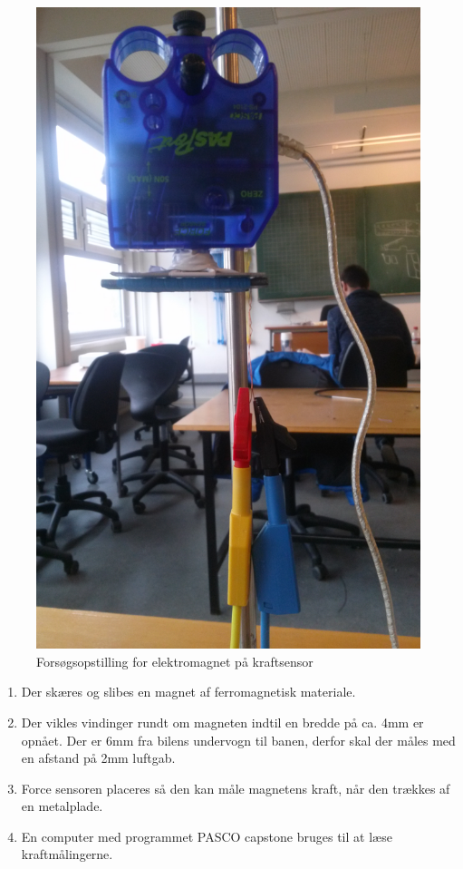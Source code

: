 \begin{figure}[h!]
\includegraphics[scale=0.04, angle=270]{./Graphics/Forsogs_opstilling}
\caption{Forsøgsopstilling for elektromagnet på kraftsensor}
\label{Opstilling}
\end{figure}

\begin{enumerate}
	\item Der skæres og slibes en magnet af ferromagnetisk materiale. 
	\item Der vikles vindinger rundt om magneten indtil en bredde på ca. 4mm er opnået. Der er 6mm fra bilens undervogn til banen, derfor skal der måles med en afstand på 2mm luftgab.
	\item Force sensoren placeres så den kan måle magnetens kraft, når den trækkes af en metalplade. 
	\item En computer med programmet PASCO capstone bruges til at læse kraftmålingerne.\\
 \end{enumerate}
  
